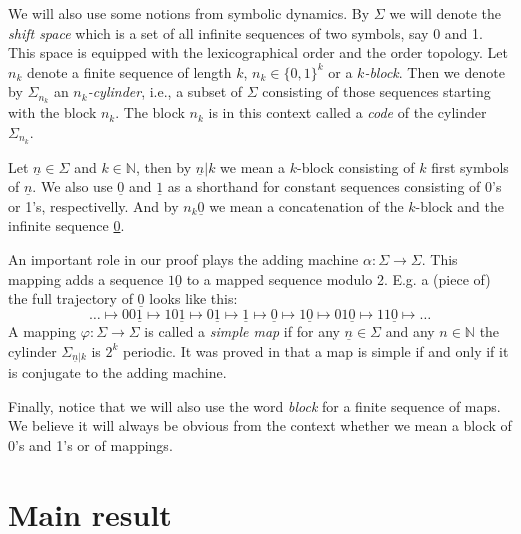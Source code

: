 \documentclass{amsart}
\begin{document}
We will also use some notions from symbolic dynamics. By $\Sigma$ we will denote the {\sl shift space} which is a set of all infinite sequences of two symbols, say 0 and 1. This space is equipped with the lexicographical order and the order topology. Let $n_k$ denote a finite sequence of length $k$, $n_k\in\{0,1\}^k$ or a {\sl $k$-block}. Then we denote by $\Sigma_{n_k}$ an {\sl $n_k$-cylinder}, i.e., a subset of $\Sigma$ consisting of those sequences starting with the block $n_k$. The block $n_k$ is in this context called a {\sl code} of the cylinder $\Sigma_{n_k}$.

Let $\underline{n}\in\Sigma$ and $k\in\mathbb{N}$, then by $\underline{n}|k$ we mean a $k$-block consisting of $k$ first symbols of $\underline{n}$. We also use $\underline{0}$ and $\underline{1}$ as a shorthand for constant sequences consisting of 0's or 1's, respectivelly. And by $n_k\underline{0}$ we mean a concatenation of the $k$-block and the infinite sequence \underline{0}.

An important role in our proof plays the adding machine $\alpha\!\!: \Sigma\rightarrow\Sigma$. This mapping adds a sequence $1\underline{0}$ to a mapped sequence modulo 2. E.g. a (piece of) the full trajectory of $\underline{0}$ looks like this:
\begin{equation}
\label{AddMachEx}
\ldots \mapsto 00\underline{1} \mapsto 10\underline{1} \mapsto 0\underline{1} \mapsto \underline{1} \mapsto \underline{0} \mapsto 1\underline{0} \mapsto 01\underline{0} \mapsto 11\underline{0} \mapsto \ldots
\end{equation}
A mapping $\varphi\!:\Sigma \rightarrow \Sigma$ is called a {\sl simple map} if for any $\underline{n} \in \Sigma$ and any $n\in\mathbb{N}$ the cylinder $\Sigma_{\underline{n}|k}$ is $2^k$ periodic. It was proved in \cite{BS} that a map is simple if and only if it is conjugate to the adding machine.

Finally, notice that we will also use the word {\sl block} for a finite sequence of maps. We believe it will always be obvious from the context whether we mean a block of 0's and 1's or of mappings.

\section{Main result}
\end{document}
